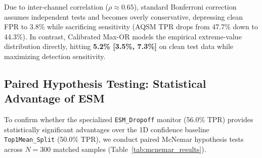 \documentclass[preprint,12pt]{elsarticle}
\begin{document}
Due to inter-channel correlation ($\rho \approx 0.65$), standard Bonferroni correction assumes independent tests and becomes overly conservative, depressing clean FPR to 3.8\% while sacrificing sensitivity (AQSM TPR drops from 47.7\% down to 44.3\%). In contrast, Calibrated Max-OR models the empirical extreme-value distribution directly, hitting \textbf{5.2\% [3.5\%, 7.3\%]} on clean test data while maximizing detection sensitivity.

\subsection{Paired Hypothesis Testing: Statistical Advantage of ESM}
\label{sec:mcnemar_testing}
To confirm whether the specialized \texttt{ESM\_Dropoff} monitor (56.0\% TPR) provides statistically significant advantages over the 1D confidence baseline \texttt{Top1Mean\_Split} (50.0\% TPR), we conduct paired McNemar hypothesis tests across $N=300$ matched samples (Table~\ref{tab:mcnemar_results}).

\begin{table}[!htbp]
\centering
\caption{Paired McNemar hypothesis testing on $N=300$ matched test images under AQSM and Query Vanishing ($2 \times 2$ contingency tables and exact two-tailed $p$-values).}
\label{tab:mcnemar_results}
\renewcommand{\arraystretch}{1.40}
\end{table}
\end{document}

